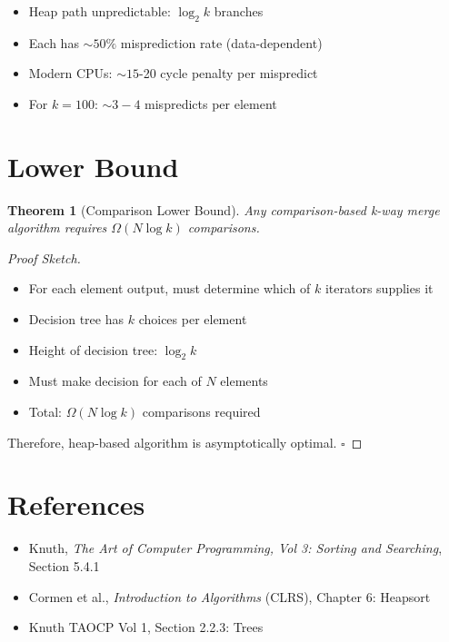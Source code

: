 \documentclass[11pt]{article}
\newtheorem{theorem}{Theorem}
\begin{document}
\begin{itemize}
    \item Heap path unpredictable: $\log_2 k$ branches
    \item Each has $\sim 50\%$ misprediction rate (data-dependent)
    \item Modern CPUs: $\sim 15$-20 cycle penalty per mispredict
    \item For $k = 100$: $\sim 3-4$ mispredicts per element
\end{itemize}

\section{Lower Bound}

\begin{theorem}[Comparison Lower Bound]
Any comparison-based k-way merge algorithm requires $\Omega(N \log k)$ comparisons.
\end{theorem}

\begin{proof}[Proof Sketch]
\begin{itemize}
    \item For each element output, must determine which of $k$ iterators supplies it
    \item Decision tree has $k$ choices per element
    \item Height of decision tree: $\log_2 k$
    \item Must make decision for each of $N$ elements
    \item Total: $\Omega(N \log k)$ comparisons required
\end{itemize}

Therefore, heap-based algorithm is asymptotically optimal. $\square$
\end{proof}

\section{References}

\begin{itemize}
    \item Knuth, \textit{The Art of Computer Programming, Vol 3: Sorting and Searching}, Section 5.4.1
    \item Cormen et al., \textit{Introduction to Algorithms} (CLRS), Chapter 6: Heapsort
    \item Knuth TAOCP Vol 1, Section 2.2.3: Trees
\end{itemize}
\end{document}
